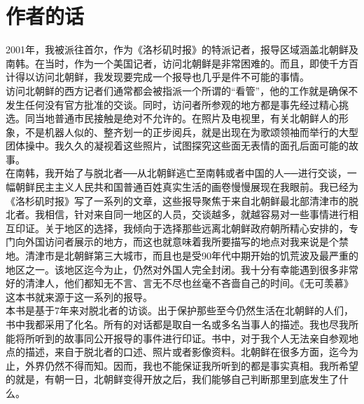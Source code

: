 \fancyhead[RO]{\thepage}
\fancyhead[LE]{\thepage}
\fancyfoot[LE,RO]{}
\fancyfoot[LO,CE]{}
\fancyfoot[CO,RE]{}
\chapter*{作者的话}
2001年，我被派往首尔，作为《洛杉矶时报》的特派记者，报导区域涵盖北朝鲜及南韩。在当时，作为一个美国记者，访问北朝鲜是非常困难的。而且，即使千方百计得以访问北朝鲜，我发现要完成一个报导也几乎是件不可能的事情。\\

访问北朝鲜的西方记者们通常都会被指派一个所谓的“看管”，他的工作就是确保不发生任何没有官方批准的交谈。同时，访问者所参观的地方都是事先经过精心挑选。同当地普通市民接触是绝对不允许的。在照片及电视里，有关北朝鲜人的形象，不是机器人似的、整齐划一的正步阅兵，就是出现在为歌颂领袖而举行的大型团体操中。我久久的凝视着这些照片，试图探究这些面无表情的面孔后面可能的故事。\\

在南韩，我开始了与脱北者──从北朝鲜逃亡至南韩或者中国的人──进行交谈，一幅朝鲜民主主义人民共和国普通百姓真实生活的画卷慢慢展现在我眼前。我已经为《洛杉矶时报》写了一系列的文章，这些报导聚焦于来自北朝鲜最北部清津市的脱北者。我相信，针对来自同一地区的人员，交谈越多，就越容易对一些事情进行相互印证。关于地区的选择，我倾向于选择那些远离北朝鲜政府朝所精心安排的，专门向外国访问者展示的地方，而这也就意味着我所要描写的地点对我来说是个禁地。清津市是北朝鲜第三大城市，而且也是受90年代中期开始的饥荒波及最严重的地区之一。该地区迄今为止，仍然对外国人完全封闭。我十分有幸能遇到很多非常好的清津人，他们都知无不言、言无不尽也丝毫不吝啬自己的时间。《无可羡慕》这本书就来源于这一系列的报导。\\

本书是基于7年来对脱北者的访谈。出于保护那些至今仍然生活在北朝鲜的人们，书中我都采用了化名。所有的对话都是取自一名或多名当事人的描述。我也尽我所能将所听到的故事同公开报导的事件进行印证。书中，对于我个人无法亲自参观地点的描述，来自于脱北者的口述、照片或者影像资料。北朝鲜在很多方面，迄今为止，外界仍然不得而知。因而，我也不能保证我所听到的都是事实真相。我所希望的就是，有朝一日，北朝鲜变得开放之后，我们能够自己判断那里到底发生了什么。\\
